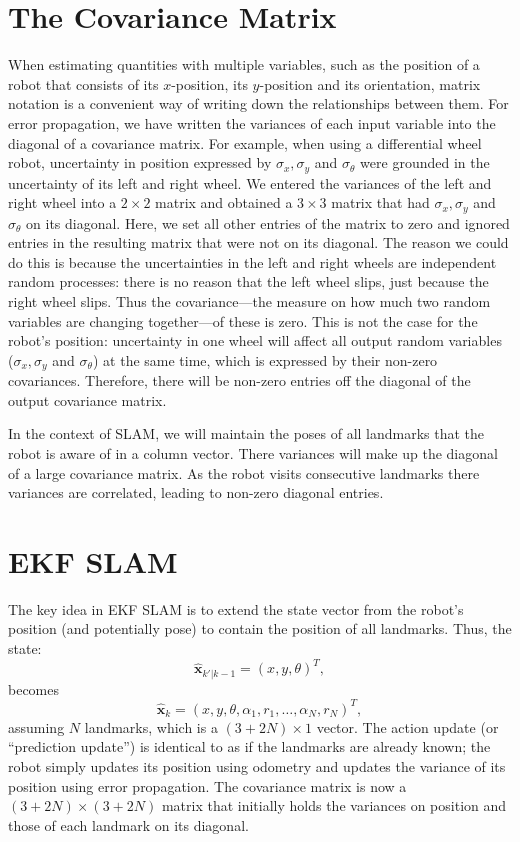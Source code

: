 \section{The Covariance Matrix}
When estimating quantities with multiple variables, such as the position of a robot that consists of its $x$-position, its $y$-position and its orientation, matrix notation is a convenient way of writing down the relationships between them. For error propagation, we have written the variances of each input variable into the diagonal of a covariance matrix. For example, when using a differential wheel robot, uncertainty in position expressed by $ \sigma_x, \sigma_y$ and $ \sigma_{\theta}$ were grounded in the uncertainty of its left and right wheel. We entered the variances of the left and right wheel into a $2 \times 2$ matrix and obtained a $3 \times 3$ matrix that had $ \sigma_x, \sigma_y$ and $ \sigma_{\theta}$ on its diagonal. Here, we set all other entries of the matrix to zero and ignored entries in the resulting matrix that were not on its diagonal. The reason we could do this is because the uncertainties in the left and right wheels are independent random processes: there is no reason that the left wheel slips, just because the right wheel slips. Thus the covariance---the measure on how much two random variables are changing together---of these is zero. This is not the case for the robot's position: uncertainty in one wheel will affect all output random variables ($ \sigma_x, \sigma_y$ and $ \sigma_{\theta}$) at the same time, which is expressed by their non-zero covariances. Therefore, there will be non-zero entries off the diagonal of the output covariance matrix.

In the context of SLAM, we will maintain the poses of all landmarks that the robot is aware of in a column vector. There variances will make up the diagonal of a large covariance matrix. As the robot visits consecutive landmarks there variances are correlated, leading to non-zero diagonal entries. 

\section{EKF SLAM}\label{sec:ekfslam}\label{sec:ekfslam}
The key idea in EKF SLAM is to extend the state vector from the robot's position (and potentially pose) to contain the position of all landmarks. Thus, the state:
\begin{equation}
\hat{\boldsymbol{x}}_{k'|k-1}=(x,y,\theta)^T,
\end{equation}
\noindent becomes
\begin{equation}
\hat{\boldsymbol{x}}_{k}=(x,y,\theta,\alpha_1,r_1,\ldots,\alpha_N,r_N)^T,
\end{equation}
\noindent assuming $ N$ landmarks, which is a $(3+2N)\times 1$ vector. The action update (or ``prediction update'') is identical to as if the landmarks are already known; the robot simply updates its position using odometry and updates the variance of its position using error propagation. The covariance matrix is now a $(3+2N) \times (3+2N)$ matrix that initially holds the variances on position and those of each landmark on its diagonal.

